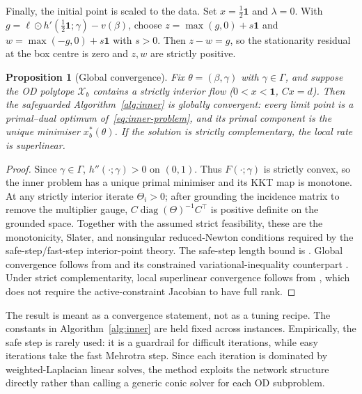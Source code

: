 \documentclass[12pt]{article}
\newcommand{\cX}{\mathcal{X}}
\newtheorem{proposition}{Proposition}
\begin{document}
Finally, the initial point is scaled to the data. Set $x=\tfrac12\mathbf 1$ and
$\lambda=0$. With $g=\ell\odot h'(\tfrac12\mathbf 1;\gamma)-v(\beta)$, choose
$z=\max(g,0)+s\mathbf 1$ and $w=\max(-g,0)+s\mathbf 1$ with $s>0$. Then $z-w=g$, so
the stationarity residual at the box centre is zero and $z,w$ are strictly positive.

\begin{proposition}[Global convergence]\label{prop:ipm}
Fix $\theta=(\beta,\gamma)$ with $\gamma\in\Gamma$, and suppose the OD polytope
$\cX_b$ contains a strictly interior flow ($0<x<\mathbf 1$, $Cx=d$). Then the
safeguarded Algorithm~\ref{alg:inner} is globally convergent: every limit point is a
primal--dual optimum of~\eqref{eq:inner-problem}, and its primal component is the
unique minimiser $x^*_b(\theta)$. If the solution is strictly complementary, the
local rate is superlinear.
\end{proposition}

\begin{proof}
Since $\gamma\in\Gamma$, $h''(\cdot;\gamma)>0$ on $(0,1)$. Thus
$F(\cdot;\gamma)$ is strictly convex, so the inner problem has a unique primal
minimiser and its KKT map is monotone. At any strictly interior iterate
$\Theta_i>0$; after grounding the incidence matrix to remove the multiplier gauge,
$C\operatorname{diag}(\Theta)^{-1}C^\top$ is positive definite on the grounded
space. Together with the assumed strict feasibility, these are the monotonicity,
Slater, and nonsingular reduced-Newton conditions required by the
safe-step/fast-step interior-point theory. The safe-step length bound is
\citet[Lemmas~3.1--3.2]{wright1996superlinear}. Global convergence follows from
\citet[Theorem~3.3]{wright1996superlinear} and its constrained variational-inequality
counterpart \citet[Theorem~1]{ralph2000superlinear}. Under strict complementarity,
local superlinear convergence follows from \citet[Theorem~2]{ralph2000superlinear},
which does not require the active-constraint Jacobian to have full rank.
\end{proof}

The result is meant as a convergence statement, not as a tuning recipe. The constants
in Algorithm~\ref{alg:inner} are held fixed across instances. Empirically, the safe
step is rarely used: it is a guardrail for difficult iterations, while easy iterations
take the fast Mehrotra step. Since each iteration is dominated by weighted-Laplacian
linear solves, the method exploits the network structure directly rather than calling
a generic conic solver for each OD subproblem.
\end{document}
